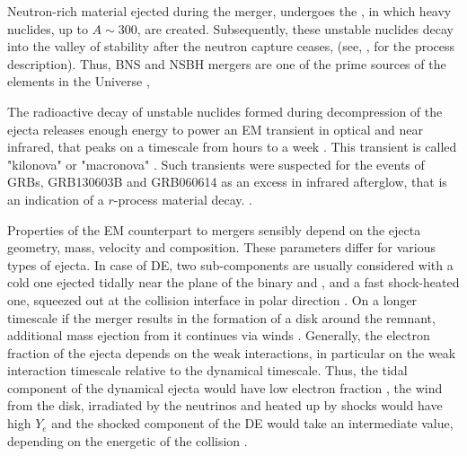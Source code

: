 Neutron-rich material ejected during the merger, undergoes the \rproc{} \nuc{}, in which heavy nuclides, up to $A\sim 300$, are created. Subsequently, these unstable nuclides decay into the valley of stability after the neutron capture ceases, (see, \eg, \citet{Burbidge:1957} for the process description). 
%
Thus, \ac{BNS} and \ac{NSBH} mergers are one of the prime sources of the \rproc{} elements in the Universe \citep{Argast:2003he,Shen:2015,VanDeVoort:2015,Ramirez-Ruiz:2014fsa}, 

The radioactive decay of unstable nuclides formed during decompression of the ejecta releases enough energy to power an \ac{EM} transient in optical and near infrared, that peaks on a timescale from hours to a week \citep{Li:1998bw,Kulkarni:2005jw,Metzger:2010,Kasen:2013xka,Tanaka:2013ana}. 
This transient is called "kilonova" \citep{Metzger:2010} or "macronova" \citep{Kulkarni:2005jw}. 
Such transients were suspected for the events of \acp{GRB}, GRB130603B \citep{Tanvir:2013pia,Berger:2013wna} and GRB060614 \citep{Yang:2015pha,Jin:2015txa} as an excess in infrared afterglow, that is an indication of a $r$-process material decay. 
. \red{[REFS]} 

Properties of the \ac{EM} counterpart to mergers sensibly depend on the ejecta geometry, mass, velocity and composition. These parameters differ for various types of ejecta. In case of \ac{DE}, two sub-components are usually considered with a cold one ejected tidally near the plane of the binary and \citep{Lattimer:1977,Freiburghaus:1999}, and a fast shock-heated one, squeezed out at the collision interface in polar direction \citep{Bauswein:2013,Hotokezaka:2013b}. 
On a longer timescale if the merger results in the formation of a disk around the remnant, additional mass ejection from it continues via winds \citep{Fernandez:2013tya,Perego:2014fma,Just:2014}.
Generally, the electron fraction of the ejecta depends on the weak interactions, in particular on the weak interaction timescale relative to the dynamical timescale.
Thus, the tidal component of the dynamical ejecta would have low electron fraction \citep{Korobkin:2012uy}, the wind from the disk, irradiated by the neutrinos and heated up by shocks would have high $Y_e$ \citep{Just:2014,Richers:2015lma} and the shocked component of the \ac{DE} would take an intermediate value, depending on the energetic of the collision \citep{Wanajo:2014,Goriely:2015fqa}. 

